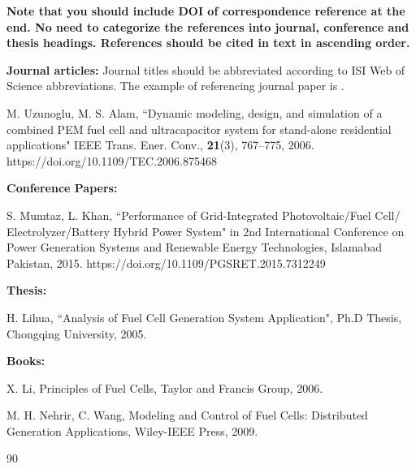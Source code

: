 \documentclass{article} %
\begin{document}
\begin{multicols}{2}
\textbf{Note that you should include DOI of correspondence reference at the end. No need to categorize the references into journal, conference and thesis headings. References should be cited in text in ascending order.}
\newline

\footnotesize{

\noindent \textbf{Journal articles:} Journal titles should be abbreviated according to ISI Web of Science abbreviations. The example of referencing journal paper is \cite{journal1}. 
\begin{thebibliography}{99}
	M. Uzunoglu, M. S. Alam, ``Dynamic modeling, design, and simulation of a combined PEM fuel cell and ultracapacitor system for stand-alone residential applications" IEEE Trans. Ener. Conv., \textbf{21}(3), 767--775, 2006. https://doi.org/10.1109/TEC.2006.875468


\hspace{-1cm} \textbf{Conference Papers:}

S. Mumtaz, L. Khan, ``Performance of Grid-Integrated Photovoltaic/Fuel Cell/ Electrolyzer/Battery Hybrid Power System" in 2nd International Conference on Power Generation Systems and Renewable Energy Technologies, Islamabad Pakistan, 2015. https://doi.org/10.1109/PGSRET.2015.7312249

\hspace{-1cm} \textbf{Thesis:}

	H. Lihua, ``Analysis of Fuel Cell Generation System Application", Ph.D Thesis, Chongqing University, 2005.

\hspace{-1cm} \textbf{Books:}

	X. Li, Principles of Fuel Cells, Taylor and Francis Group, 2006.

	M. H. Nehrir, C. Wang, Modeling and Control of Fuel Cells: Distributed Generation Applications, Wiley-IEEE Press, 2009.

\end{thebibliography}{90}
\noindent

} 

\end{multicols}
\end{document}
